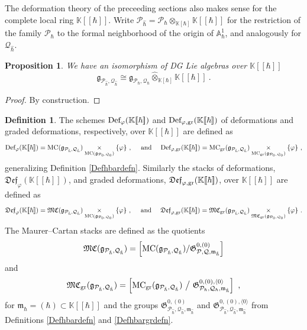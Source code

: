 \documentclass[11pt]{amsart}
\numberwithin{equation}{section}
\newtheorem{prop}[theo]{Proposition}
\theoremstyle{definition}
\newtheorem{defn}[theo]{Definition}
\newcommand{\bb}{\mathbb}
\newcommand{\mc}{\mathcal}
\newcommand{\mf}{\mathfrak}
\newcommand{\Def}{{\textup{Def}}}
\newcommand{\fDef}{{\mathfrak{Def}}}
\newcommand{\Ph}{{\mathcal{P}_\hbar}}
\newcommand{\Qh}{{\mathcal{Q}_\hbar}}
\newcommand{\fph}{{[\![\hbar]\!]}}
\newcommand{\K}{{\bb K}}
\newcommand{\ik}{{\bb K}}
\newcommand{\MC}{{{\textup{MC}}}}
\newcommand{\fMC}{{{\mathfrak{MC}}}}
\newcommand{\0}{{\textbf{0}}}
\newcommand{\gr}{\textup{gr}}
\newcommand{\g}{{\mf{g}}}
\def\IA{\mathbb{A}}
\def\PP{{\mc P}}
\def\QQ{{\mc Q}}
\def\gf{\mathfrak{g}}
\def \mf{\mathfrak}
\newcommand{\fibre}[1]{\underset{#1}{\times}}
\begin{document}
The deformation theory of the preceeding sections also makes sense for the complete local ring $\ik\fph$. Write $\PP_{\hat \hbar} = \PP_{\hbar}\otimes_{\ik[\hbar]}\ik\fph$ for the restriction of the family $\PP_\hbar$ to the formal neighborhood of the origin of $\IA^1_\hbar$, and analogously for $\QQ_{\hat \hbar}$.

\begin{prop}
	We have an isomorphism of DG Lie algebras over $\ik\fph$
	\[
	\gf_{\PP_{\hat \hbar} , \QQ_{\hat \hbar}} \cong \gf_{\PP_\hbar,\QQ_\hbar} \widehat{\otimes}_{\ik[\hbar]} \ik\fph~.
	\]
\end{prop}
\begin{proof}
	By construction.
\end{proof}




\begin{defn}\label{Defformaldef}
	The schemes $\Def_{\varphi}(\K\fph)$ and $\Def_{\varphi,\gr}(\ik\fph)$ of deformations and graded deformations, respectively, over $\K\fph$ are defined as
	\[ 
	\Def_{\varphi}(\K\fph) = \MC(\g_{\mc P_{\hat{\hbar}},\mc Q_{\hat{\hbar}}}) \fibre{\MC(\g_{\mc P_0, \mc Q_0})} \{\varphi\} ~, 
	\quad \text{ and } \quad
	\Def_{\varphi,\gr}(\ik\fph) = \MC_\gr(\gf_{\PP_{\hat \hbar},\QQ_{\hat \hbar}})\fibre{\MC_\gr(\gf_{\PP_0,\QQ_0})}\{\varphi\}~,
	\]
	generalizing Definition \ref{Defhbardefn}. Similarly the stacks of deformations, $\fDef_{\varphi}(\K\fph)$, and graded deformations, $\fDef_{\varphi,\gr}(\ik\fph)$, over $\K\fph$ are defined as
	\[ 
	\fDef_{\varphi}(\K\fph) = \fMC(\g_{\mc P_{\hat{\hbar}},\mc Q_{\hat{\hbar}}}) \fibre{\MC(\g_{\mc P_0, \mc Q_0})} \{\varphi\}   \ , 
	\quad \text{ and } \quad 
	\fDef_{\varphi,\gr}(\ik\fph) = \fMC_\gr(\gf_{\PP_{\hat \hbar},\QQ_{\hat \hbar}})\fibre{\fMC_\gr(\gf_{\PP_0,\QQ_0})}\{\varphi\}~.
	\]
	The Maurer--Cartan stacks are defined as the quotients
	\[
	\fMC(\g_{\mc P_{\hat{\hbar}},\mc Q_{\hat{\hbar}}})= \left[\MC(\g_{\mc P_{\hat{\hbar}},\mc Q_{\hat{\hbar}}}) /\mf G_{\mc P,\mc Q,\mf m_{\hat{\hbar}}}^{0,(0)}\right] 
	\]
	and
	\[ 
	\fMC_\gr(\g_{\PP_{\hat \hbar},\QQ_{\hat \hbar} })= \left[ \MC_\gr(\g_{\PP_{\hat \hbar},\QQ_{\hat \hbar} })\  \big/\  \mf G^{0,(0),\langle 0\rangle}_{\Ph,\Qh,\mf m_{\hat \hbar}} \right]  ~,
	\]
	for $\mf m_{\hat{\hbar}}=(\hbar) \subset \K\fph$ and the groups $\mf G^{0,(0)}_{\PP_{\hat \hbar},\QQ_{\hat \hbar},\mf m_{\hat \hbar}}$ and $\mf G^{0,(0),\langle 0 \rangle}_{\PP_{\hat \hbar},\QQ_{\hat \hbar},\mf m_{\hat \hbar}}$ from Definitions \ref{Defhbardefn} and \ref{Defhbargrdefn}.
\end{defn}
\end{document}
